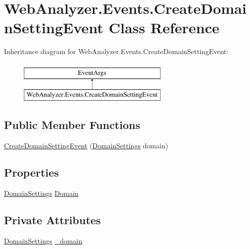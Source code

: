 \hypertarget{class_web_analyzer_1_1_events_1_1_create_domain_setting_event}{}\section{Web\+Analyzer.\+Events.\+Create\+Domain\+Setting\+Event Class Reference}
\label{class_web_analyzer_1_1_events_1_1_create_domain_setting_event}
Inheritance diagram for Web\+Analyzer.\+Events.\+Create\+Domain\+Setting\+Event\+:\begin{figure}[H]
\begin{center}
\leavevmode
\includegraphics[height=2.000000cm]{class_web_analyzer_1_1_events_1_1_create_domain_setting_event}
\end{center}
\end{figure}
\subsection*{Public Member Functions}
\begin{DoxyCompactItemize}
\item 
\hyperlink{class_web_analyzer_1_1_events_1_1_create_domain_setting_event_ab1fc9b02080ecdb86b4a7f35fca4c407}{Create\+Domain\+Setting\+Event} (\hyperlink{class_web_analyzer_1_1_models_1_1_settings_model_1_1_domain_settings}{Domain\+Settings} domain)
\end{DoxyCompactItemize}
\subsection*{Properties}
\begin{DoxyCompactItemize}
\item 
\hyperlink{class_web_analyzer_1_1_models_1_1_settings_model_1_1_domain_settings}{Domain\+Settings} \hyperlink{class_web_analyzer_1_1_events_1_1_create_domain_setting_event_a38563439a3da6789afcb3dc1e3fb30e3}{Domain}
\end{DoxyCompactItemize}
\subsection*{Private Attributes}
\begin{DoxyCompactItemize}
\item 
\hyperlink{class_web_analyzer_1_1_models_1_1_settings_model_1_1_domain_settings}{Domain\+Settings} \hyperlink{class_web_analyzer_1_1_events_1_1_create_domain_setting_event_a5b8ba22cce1bd494bd41634f6338801e}{\+\_\+domain}
\end{DoxyCompactItemize}


